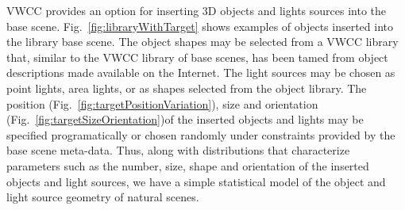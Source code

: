 \documentclass{jov}
\begin{document}
VWCC provides an option for inserting 3D objects and lights sources into the base scene. Fig.~\ref{fig:libraryWithTarget} shows examples of objects inserted into the library base scene. The object shapes may be selected from a VWCC library that, similar to the VWCC library of base scenes, has been tamed from object descriptions made available on the Internet. The light sources may be chosen as point lights, area lights, or as shapes selected from the object library. The position (Fig.~\ref{fig:targetPositionVariation}), size and orientation (Fig.~\ref{fig:targetSizeOrientation})of the inserted objects and lights may be specified programatically or chosen randomly under constraints provided by the base scene meta-data. Thus, along with distributions that characterize parameters such as the number, size, shape and orientation of the inserted objects and light sources, we have a simple statistical model of the object and light source geometry of natural scenes. 
\end{document}
